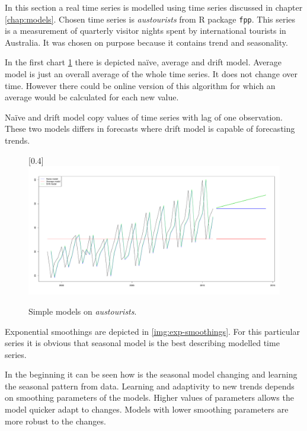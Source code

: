     In this section a real time series is modelled using time series discussed in chapter \ref{chap:models}.
    Chosen time series is \emph{austourists} from R package \texttt{fpp}. This series is a measurement of quarterly
    visitor nights spent by international tourists in Australia. It was chosen on purpose because it contains trend
    and seasonality.

    In the first chart \ref{img:simple-models} there is depicted na\"{i}ve, average and drift model. Average model is
    just an overall average of the whole time series. It does not change over time. However there could be online
    version of this algorithm for which an average would be calculated for each new value.

    Na\"{i}ve and drift model copy values of time series with lag of one observation. These two models differs in
    forecasts where drift model is capable of forecasting trends.

    \begin{figure}[H]
        \begin{center}
            \scalebox{0.255}[0.4]{\includegraphics{img/simple-models.pdf}}
            \caption{Simple models on \emph{austourists}.}
            \label{img:simple-models}
        \end{center}
    \end{figure}

    Exponential smoothings are depicted in \ref{img:exp-smoothings}. For this particular series it is obvious that
    seasonal model is the best describing modelled time series.

    In the beginning it can be seen how is the seasonal model changing and learning the seasonal pattern from data.
    Learning and adaptivity to new trends depends on smoothing parameters of the models. Higher values of parameters
    allows the model quicker adapt to changes. Models with lower smoothing parameters are more robust to the changes.

